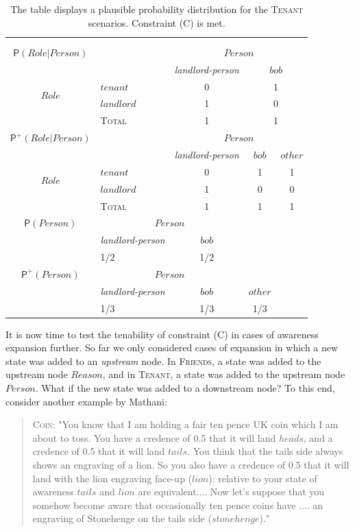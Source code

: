 \documentclass[
  11pt,
  dvipsnames,enabledeprecatedfontcommands, todos]{scrartcl}
\newcommand{\pr}[1]{\ensuremath{\mathsf{P}(#1)}}
\newcommand{\ppr}[2]{\ensuremath{\mathsf{P}^{#1}(#2)}}
\begin{document}
\begin{table}[h]
\begin{tabular}{clccc}
&&&&\\
&&&&\\
$\pr{Role \vert Person}$ & & \multicolumn{3}{c}{$Person$} \\
 &   & \textit{landlord-person}  & \multicolumn{2}{c}{$bob$} \\
\multirow{2}{*}{$Role$} & $tenant$ & 0 & \multicolumn{2}{c}{1}\\
& $landlord$  & 1 & \multicolumn{2}{c}{0} \\
\hline
& \textsc{Total} & 1 & \multicolumn{2}{c}{1}  \\
\hline
\hline
$\ppr{+}{Role \vert Person}$ & & \multicolumn{3}{c}{$Person$} \\
&  & \textit{landlord-person} & $bob$ & $other$ \\
\multirow{2}{*}{$Role$} & $tenant$ & 0 & 1 & 1\\ 
& $landlord$ & 1 & 0 & 0 \\
\hline
& \textsc{Total} & 1 & 1 & 1  \\
\hline
\hline
$\pr{Person}$ & \multicolumn{2}{c}{$Person$} & \\
&  \textit{landlord-person} & $bob$ & \\
& 1/2 & 1/2 & \\
\hline
\hline
$\ppr{+}{Person}$ & \multicolumn{2}{c}{$Person$} & \\
&  \textit{landlord-person} & $bob$ & $other$ \\
& 1/3 & 1/3 & 1/3 \\
\end{tabular}
\caption{The table displays a plausible probability distribution for the \textsc{Tenant} scenarios. Constraint (C) is met.}
\label{table:tenant}
\end{table}

It is now time to test the tenability of constraint (C) in cases of
awareness expansion further. So far we only considered cases of
expansion in which a new state was added to an \emph{upstream} node. In
\textsc{Friends}, a state was added to the upstream node \(Reason\), and
in \textsc{Tenant}, a state was added to the upstream node \(Person\).
What if the new state was added to a downstream node? To this end,
consider another example by Mathani:

\begin{quote} 
\textsc{Coin}: "You know that I am holding a fair ten pence UK coin which I am about to toss. You
have a credence of 0.5 that it will land $heads$, and a credence of 0.5 that it will
land $tails$. You think that the tails side always shows an engraving of a lion. So you
also  have a credence of 0.5 that it will land with the lion engraving face-up ($lion$): relative to your state of awareness $tails$ and $lion$ are equivalent.... Now let's suppose that you somehow become aware that occasionally ten pence coins have .... an engraving of Stonehenge on the tails side ($stonehenge$)." 
\end{quote}
\end{document}

